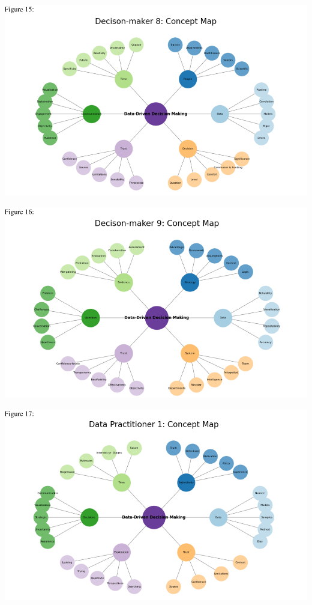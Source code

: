 \documentclass{article}
\begin{document}
\includegraphics{210431461_CSC8639_Dissertation_files/figure-latex/unnamed-chunk-11-1.pdf}

\includegraphics{210431461_CSC8639_Dissertation_files/figure-latex/unnamed-chunk-12-1.pdf}

\includegraphics{210431461_CSC8639_Dissertation_files/figure-latex/unnamed-chunk-13-1.pdf}
\end{document}
